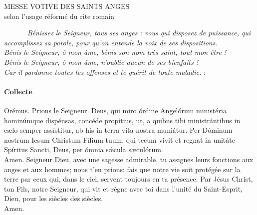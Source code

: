 \documentclass[twoside]{article}
\begin{document}
\null \newpage

\sloppy

\begin{center}\begin{doublespace}
{
\MakeUppercase{\Large Messe votive des saints anges}\\
selon l'usage réformé du rite romain
}
\end{doublespace}\end{center}



~~~~~~
\emph{\rr Bénissez le Seigneur, tous ses anges : vous qui disposez de puissance, qui accomplissez sa parole, pour qu’on entende la voix de ses dispositions.\\
\vv {} Bénis le Seigneur, ô mon âme, bénis son nom très saint, tout mon être !\\
\vv {} Bénis le Seigneur, ô mon âme, n'oublie aucun de ses bienfaits !\\
\vv {} Car il pardonne toutes tes offenses et te guérit de toute maladie.}
:\vfill
{}

\pagebreak

\paragraph{Collecte}

\begin{paracol}{2}
\vv Orémus.
\switchcolumn
\vv Prions le Seigneur.
\switchcolumn*
Deus, qui miro órdine
Angelórum ministéria hominúmque dispénsas,
concéde propítius,
ut, a quibus tibi ministrántibus in cælo semper assístitur,
ab his in terra vita nostra muniátur.
Per Dóminum nostrum Iesum Christum Fílium
tuum, qui tecum vivit et regnat in unitáte Spíritus Sancti, Deus, per ómnia
sǽcula sæculórum.\\
\rr Amen.
\switchcolumn
Seigneur Dieu,
avec une sagesse admirable,
tu assignes leurs fonctions aux anges et aux hommes;
nous t'en prions:
fais que notre vie soit protégée sur la terre
par ceux qui, dans le ciel,
servent toujours en ta présence.
Par Jésus Christ, ton Fils, notre Seigneur,
qui vit et règne avec toi dans l'unité du Saint-Esprit,
Dieu, pour les siècles des siècles.\\
\rr Amen.
\end{paracol}
\end{document}
